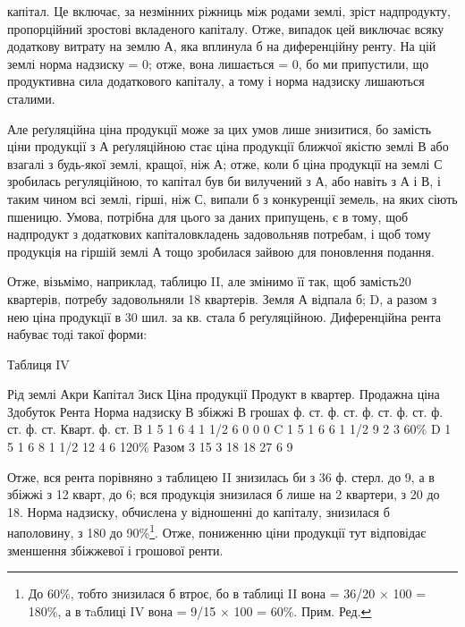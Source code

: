 капітал. Це включає, за незмінних ріжниць між родами землі, зріст надпродукту,
пропорційний зростові вкладеного капіталу. Отже, випадок цей виключає всяку
додаткову витрату на землю А, яка вплинула б на диференційну ренту. На цій землі
норма надзиску = 0; отже, вона лишається = 0, бо ми припустили, що продуктивна
сила додаткового капіталу, а тому і норма надзиску лишаються сталими.

Але реґуляційна ціна продукції може за цих умов лише знизитися, бо замість
ціни продукції з А реґуляційною стає ціна продукції ближчої якістю землі
В або взагалі з будь-якої землі, кращої, ніж А; отже, коли б ціна продукції
на землі С зробилась регуляційною, то капітал був би вилучений з А,
або навіть з А і В, і таким чином всі землі, гірші, ніж С, випали б з конкуренції
земель, на яких сіють пшеницю. Умова, потрібна для цього за даних
припущень, є в тому, щоб надпродукт з додаткових капіталовкладень задовольняв
потребам, і щоб тому продукція на гіршій землі А тощо зробилася
зайвою для поновлення подання.

Отже, візьмімо, наприклад, таблицю II, але змінимо її так, щоб замість20
квартерів, потребу задовольняли 18 квартерів. Земля А відпала б; D, а
разом з нею ціна продукції в 30 шил. за кв. стала б реґуляційною. Диференційна
рента набуває тоді такої форми:

Таблиця IV

Рід землі    Акри    Капітал    Зиск    Ціна продукції
Продукт в квартер. Продажна ціна    Здобуток    Рента    Норма надзиску
                                В збіжжі    В грошах
     ф. ст. ф. ст. ф. ст. ф. ст. ф. ст. ф. ст. Кварт. ф. ст.
B    1    5    1    6    4    1 1/2    6    0    0    0
C    1    5    1    6    6    1 1/2    9    2    3    60\%
D    1    5    1    6    8    1 1/2    12    4    6    120\%
 Разом    3    15    3    18    18        27    6    9

Отже, вся рента порівняно з таблицею II знизилась би з 36 ф. стерл.
до 9, а в збіжжі з 12 кварт, до 6; вся продукція знизилася б лише на 2
квартери, з 20 до 18. Норма надзиску, обчислена у відношенні до капіталу,
знизилася б наполовину, з 180 до 90\%\footnote*{
До 60\%, тобто знизилася б втроє, бо в таблиці II вона = 36/20 × 100 = 180\%, а в тaблиці
IV вона = 9/15 × 100 = 60\%. Прим. Ред.
}. Отже, пониженню ціни продукції
тут відповідає зменшення збіжжевої і грошової ренти.


